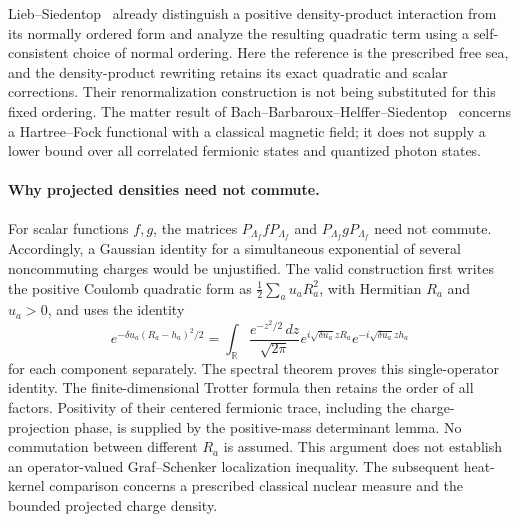 Lieb--Siedentop~\cite{LS} already distinguish a positive density-product
interaction from its normally ordered form and analyze the resulting
quadratic term using a self-consistent choice of normal ordering.  Here
the reference is the prescribed free sea, and the density-product
rewriting retains its exact quadratic and scalar corrections.  Their
renormalization construction is not being substituted for this fixed
ordering.  The matter result of Bach--Barbaroux--Helffer--Siedentop~\cite{BBHS}
concerns a Hartree--Fock functional with a classical magnetic field;
it does not supply a lower bound over all correlated fermionic states
and quantized photon states.

\paragraph{Why projected densities need not commute.}
For scalar functions $f,g$, the matrices $P_{\Lambda_f}fP_{\Lambda_f}$ and
$P_{\Lambda_f}gP_{\Lambda_f}$ need not commute.  Accordingly, a Gaussian
identity for a simultaneous exponential of several noncommuting charges
would be unjustified.  The valid construction first writes the positive
Coulomb quadratic form as $\frac12\sum_a u_a R_a^2$, with Hermitian $R_a$
and $u_a>0$, and uses the identity
\begin{equation}
 e^{-\delta u_a(R_a-h_a)^2/2}
 =\int_{\mathbb R}\frac{e^{-z^2/2}\,dz}{\sqrt{2\pi}}
   e^{i\sqrt{\delta u_a}zR_a}
   e^{-i\sqrt{\delta u_a}zh_a}
 \label{context:hs}
\end{equation}
for each component separately.  The spectral theorem proves this
single-operator identity.  The finite-dimensional Trotter formula then
retains the order of all factors.  Positivity of their centered fermionic
trace, including the charge-projection phase, is supplied by the
positive-mass determinant lemma.  No commutation between different $R_a$
is assumed.  This argument does not establish an operator-valued
Graf--Schenker localization inequality.  The subsequent heat-kernel
comparison concerns a prescribed classical nuclear measure and the
bounded projected charge density.

